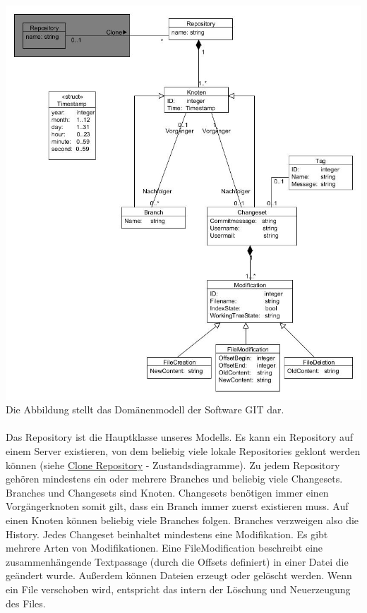 \documentclass[a4paper]{article}
\begin{document}
\includegraphics[width=\textwidth]{Domaenenmodell.jpg}\\
Die Abbildung stellt das Domänenmodell der Software GIT dar.\\\\

Das Repository ist die Hauptklasse unseres Modells. Es kann ein Repository auf einem Server existieren, von dem beliebig viele lokale Repositories geklont werden können (siehe \hyperlink{target}{Clone Repository} - Zustandsdiagramme). Zu jedem Repository gehören mindestens ein oder mehrere Branches und beliebig viele \gls{Changeset}s. Branches und Changesets sind Knoten. Changesets benötigen immer einen Vorgängerknoten somit gilt, dass ein Branch immer zuerst existieren muss. Auf einen Knoten können beliebig viele Branches folgen. Branches verzweigen also die History. Jedes Changeset beinhaltet mindestens eine Modifikation. Es gibt mehrere Arten von Modifikationen. Eine FileModification beschreibt eine zusammenhängende Textpassage (durch die Offsets definiert) in einer Datei die geändert wurde. Außerdem können Dateien erzeugt oder gelöscht werden. Wenn ein File verschoben wird, entspricht das intern der Löschung und Neuerzeugung des Files.
\end{document}
